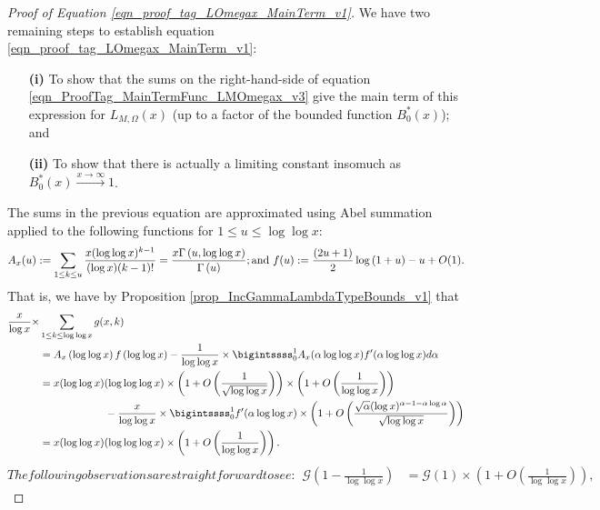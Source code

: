 \documentclass[11pt,reqno,a4letter]{article}
\newcommand{\hlocalref}[1]{\hyperref[#1]{\ref{#1}}}
\numberwithin{equation}{section}
\numberwithin{figure}{section}
\numberwithin{table}{section}
\theoremstyle{plain}
\numberwithin{theorem}{section}
\theoremstyle{definition}
\theoremstyle{remark}
\newcommand{\mathtext}[1]{\text{\rm #1}}
\begin{document}
\begin{proof}[Proof of Equation \eqref{eqn_proof_tag_LOmegax_MainTerm_v1}]
We have two remaining steps to establish equation \eqref{eqn_proof_tag_LOmegax_MainTerm_v1}: 
\begin{itemize}[leftmargin=0.5in]
\item[\textbf{(i)}] To show that the sums on the right-hand-side of equation 
     \eqref{eqn_ProofTag_MainTermFunc_LMOmegax_v3} give the main term of this expression for 
     $L_{M,\Omega}(x)$ (up to a factor of the bounded function $B_0^{\ast}(x)$); and 
\item[\textbf{(ii)}] To show that there is actually a limiting constant insomuch as 
     $B_0^{\ast}(x) \xrightarrow{x \rightarrow \infty} 1$. 
\end{itemize}
The sums in the previous equation are approximated using Abel summation applied to the 
following functions for $1 \leq u \leq \log\log x$: 
\[
A_x(u) := \sum_{1 \leq k \leq u} \frac{x (\log\log x)^{k-1}}{(\log x) (k-1)!} = 
     \frac{x \Gamma\left(u, \log\log x\right)}{\Gamma\left(u\right)}; 
     \mathtext{ and } 
     f(u) := \frac{(2u+1)}{2} \log\left(1 + u\right) - u + O(1). 
\]
That is, we have by Proposition \hlocalref{prop_IncGammaLambdaTypeBounds_v1} that 
\begin{align}
\label{eqn_proof_tag_LOmegax_MainTerm_v2}
\frac{x}{\log x} \times & \sum_{1 \leq k \leq \log\log x} g(x, k) \\ 
\notag
	& = A_x\left(\log\log x\right) f\left(\log\log x\right) - 
	\frac{1}{\log\log x} \times 
	\bigintssss_0^{1} A_x(\alpha \log\log x) f^{\prime}(\alpha \log\log x) d\alpha \\ 
\notag 
     & = 
	x (\log\log x) (\log\log\log x) \times \left(1 + 
	O\left(\frac{1}{\sqrt{\log\log x}}\right)\right) \times \left(1 + 
     O\left(\frac{1}{\log\log x}\right)\right) \\ 
\notag 
     & \phantom{=x(\log\log x)\ } - 
	\frac{x}{\log\log x} \times \bigintssss_0^1 f^{\prime}(\alpha \log\log x) \times 
	\left(1 + O\left(\frac{\sqrt{\alpha} (\log x)^{\alpha-1-\alpha\log\alpha}}{\sqrt{\log\log x}}\right)\right) \\
\notag
	& = 
	x (\log\log x)(\log\log\log x) \times \left(1 + 
	O\left(\frac{1}{\log\log x}\right)\right). 
\end{align}
\begin{subequations}
\label{eqn_ProofTag_MiscObservations_EMMVT_v1}
The following observations are straightforward to see:
\begin{align}
\mathcal{G}\left(1-\frac{1}{\log\log x}\right) & = \mathcal{G}\left(1\right) \times 
	\left(1 + O\left(\frac{1}{\log\log x}\right)\right), 

\end{align}
\end{subequations}
\end{proof}
\end{document}
